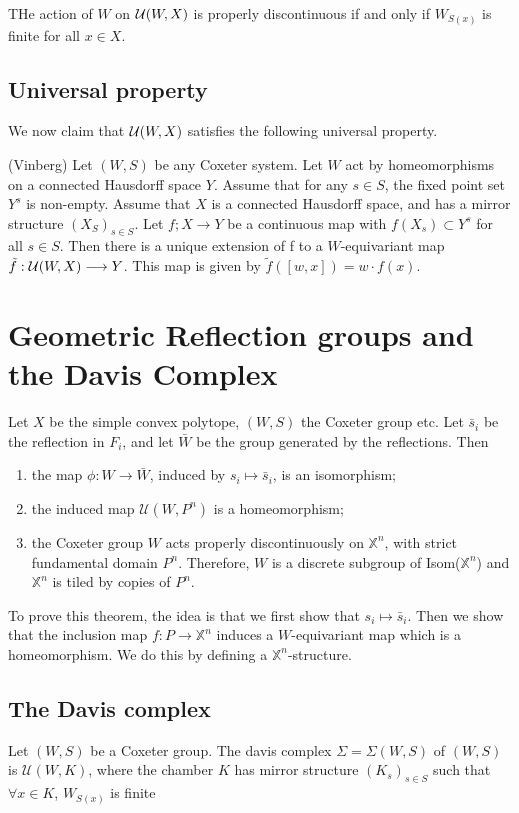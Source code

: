 \documentclass[12pt]{article}
\begin{document}
\begin{lemma}
    THe action of $W$ on $\mathcal{U}(W,X)$ is properly discontinuous if and only if $W_{S(x)}$ is finite for all $x\in X$. 
\end{lemma}

\subsection{Universal property}

We now claim that $\mathcal{U}(W,X)$ satisfies the following universal property.

\begin{theorem}
    (Vinberg) Let $(W,S)$ be any Coxeter system. Let $W$ act by homeomorphisms on a connected Hausdorff space $Y$. Assume that for any $s\in S$, the fixed point set $Y^s$ is non-empty. Assume that $X$ is a connected Hausdorff space, and has a mirror structure $(X_S)_{s\in S}$. Let $f;X\longrightarrow Y$ be a continuous map with $f(X_s)\subset Y^s$ for all $s\in S$. Then there is a unique extension of f to a $W$-equivariant map $\tilde{f}:\mathcal{U}(W,X) \longrightarrow Y$. This map is given by $\tilde{f}([w,x])=w\cdot f(x)$. 
\end{theorem}

\section{Geometric Reflection groups and the Davis Complex}
\begin{theorem}
    Let $X$ be the simple convex polytope, $(W,S)$ the Coxeter group etc. Let $\bar{s}_i$ be the reflection in $F_i$, and let $\bar{W}$ be the group generated by the reflections. Then 
    \begin{enumerate}
        \item the map $\phi: W\longrightarrow\bar{W}$, induced by $s_i\mapsto \bar{s}_i$, is an isomorphism;
        \item the induced map $\mathcal{U}(W,P^n)$ is a homeomorphism;
        \item the Coxeter group $W$ acts properly discontinuously on $\mathbb{X}^n$, with strict fundamental domain $P^n$. Therefore, $W$ is a discrete subgroup of Isom($\mathbb{X}^n$) and $\mathbb{X}^n$ is tiled by copies of $P^n$. 
    \end{enumerate}

\end{theorem}

To prove this theorem, the idea is that we first show that $s_i\mapsto \bar{s}_i$. Then we show that the inclusion map $f: P\longrightarrow \mathbb{X}^n$ induces a $W$-equivariant map which is a homeomorphism. We do this by defining a $\mathbb{X}^n$-structure.


\subsection{The Davis complex}

\begin{definition}
    Let $(W,S)$ be a Coxeter group. The davis complex $\Sigma=\Sigma(W,S)$ of $(W,S)$ is $\mathcal{U}(W,K)$, where  the chamber $K$ has mirror structure $(K_s)_{s\in S}$ such that $\forall x\in K$, $W_{S(x)}$ is finite
\end{definition}
\end{document}

